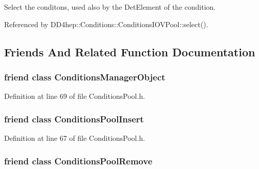 Select the conditons, used also by the DetElement of the condition. 

Referenced by DD4hep::Conditions::ConditionsIOVPool::select().

\subsection{Friends And Related Function Documentation}
\hypertarget{class_d_d4hep_1_1_conditions_1_1_conditions_pool_a8bc615a0a23a8207d3e5399c5066763e}{
\subsubsection[{ConditionsManagerObject}]{\setlength{\rightskip}{0pt plus 5cm}friend class {\bf ConditionsManagerObject}}}
\label{class_d_d4hep_1_1_conditions_1_1_conditions_pool_a8bc615a0a23a8207d3e5399c5066763e}


Definition at line 69 of file ConditionsPool.h.\hypertarget{class_d_d4hep_1_1_conditions_1_1_conditions_pool_adc5b872586a9fed84b7604b98cb7bd58}{
\subsubsection[{ConditionsPoolInsert}]{\setlength{\rightskip}{0pt plus 5cm}friend class {\bf ConditionsPoolInsert}}}
\label{class_d_d4hep_1_1_conditions_1_1_conditions_pool_adc5b872586a9fed84b7604b98cb7bd58}


Definition at line 67 of file ConditionsPool.h.\hypertarget{class_d_d4hep_1_1_conditions_1_1_conditions_pool_a3b722c844edb9493ba7339da2813026b}{
\subsubsection[{ConditionsPoolRemove}]{\setlength{\rightskip}{0pt plus 5cm}friend class {\bf ConditionsPoolRemove}}}
\label{class_d_d4hep_1_1_conditions_1_1_conditions_pool_a3b722c844edb9493ba7339da2813026b}



